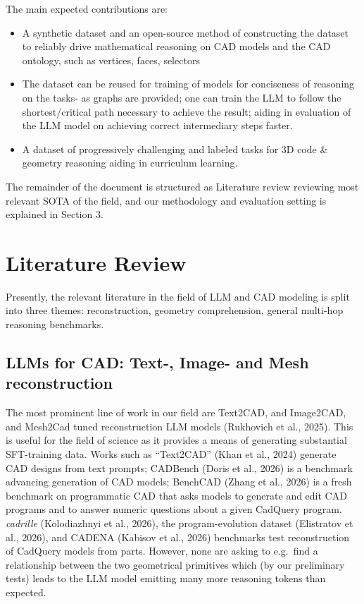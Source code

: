 \documentclass[10pt]{article}
\begin{document}
The main expected contributions are:
\begin{itemize}
  \item A synthetic dataset and an open-source method of constructing the dataset to reliably drive mathematical reasoning on CAD models and the CAD ontology, such as vertices, faces, selectors
  \item The dataset can be reused for training of models for conciseness of reasoning on the tasks- as graphs are provided; one can train the LLM to follow the shortest/critical path necessary to achieve the result; aiding in evaluation of the LLM model on achieving correct intermediary steps faster.
  \item A dataset of progressively challenging and labeled tasks for 3D code \& geometry reasoning aiding in curriculum learning.
\end{itemize}

The remainder of the document is structured as Literature review reviewing most relevant SOTA of the field, and our methodology and evaluation setting is explained in Section 3.

\section{Literature Review}

Presently, the relevant literature in the field of LLM and CAD modeling is split into three themes: reconstruction, geometry comprehension, general multi-hop reasoning benchmarks.

\subsection{LLMs for CAD: Text-, Image- and Mesh reconstruction}

The most prominent line of work in our field are Text2CAD, and Image2CAD, and Mesh2Cad tuned reconstruction LLM models (Rukhovich et al., 2025). This is useful for the field of science as it provides a means of generating substantial SFT-training data. Works such as ``Text2CAD'' (Khan et al., 2024) generate CAD designs from text prompts; CADBench (Doris et al., 2026) is a benchmark advancing generation of CAD models; BenchCAD (Zhang et al., 2026) is a fresh benchmark on programmatic CAD that asks models to generate and edit CAD programs and to answer numeric questions about a given CadQuery program. \textit{cadrille} (Kolodiazhnyi et al., 2026), the program-evolution dataset (Elistratov et al., 2026), and CADENA (Kabisov et al., 2026) benchmarks test reconstruction of CadQuery models from parts. However, none are asking to e.g.\ find a relationship between the two geometrical primitives which (by our preliminary tests) leads to the LLM model emitting many more reasoning tokens than expected.
\end{document}
